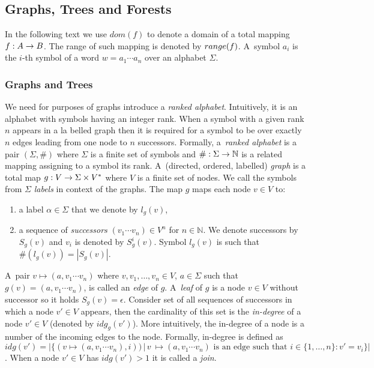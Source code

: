 \documentclass[a4paper, 12pt]{article}
\begin{document}
\subsection{Graphs, Trees and Forests}
\label{sec:graph}

In the following text we use $dom(f)$ to denote a domain of a total mapping $f: A \rightarrow B$.
The range of such mapping is denoted by $range(f)$.
A~symbol $a_i$ is the $i$-th symbol of a word $w = a_1 \cdots a_n$ over an alphabet $\Sigma$.

\subsubsection{Graphs and Trees}
\label{subsec:graph}
We need for purposes of graphs introduce a \emph{ranked alphabet}.
Intuitively, it is an alphabet with symbols having an integer rank.
When a symbol with a given rank $n$ appears in a la belled graph
then it is required for a symbol to be over exactly $n$ edges
leading from one node to $n$ successors.
Formally, a~\emph{ranked alphabet} is a pair $(\Sigma, \#)$ where $\Sigma$ is
a finite set of symbols and $\#: \Sigma \rightarrow \mathbb{N}$ is a related mapping
assigning to a symbol its rank.
A~(directed, ordered, labelled) \emph{graph} is a total map $g: V \rightarrow \Sigma \times V^{*}$ where $V$ is a finite set of nodes.
We call the symbols from $\Sigma$ \emph{labels} in context of the graphs.
The map $g$ maps each node $v\in V$ to:
\begin{enumerate}
	\item a label $\alpha \in \Sigma$ that we denote by $l_g(v)$,
	\item a sequence of \emph{successors} $(v_1 \cdots v_n) \in V^n$ for $n \in \mathbb{N}$.
		We denote successors by $S_g(v)$ and $v_i$ is denoted by $S^i_g(v)$.
	    Symbol $l_g(v)$ is such that $\#(l_g(v)) = |S_g(v)|$.
\end{enumerate}

A~pair $v \mapsto (a, v_1 \cdots v_n)$ where $v, v_1, \ldots, v_n \in V$,
$a \in \Sigma$ such that $g(v) = (a, v_1 \cdots v_n)$, is called an \emph{edge} of $g$.
A~\emph{leaf} of $g$ is a node $v \in V$ without successor so it holds $S_g(v) = \epsilon$.
Consider set of all sequences of successors in which a node $v' \in V$ appears, then
the cardinality of this set is the \emph{in-degree} of a node $v' \in V$ (denoted by $idg_g(v')$).
More intuitively, the in-degree of a node is a number of the incoming edges to the node.
Formally, in-degree is defined as
$idg(v') = |\{(v \mapsto (a, v_1 \cdots v_n),i)) \,|\, v~\mapsto (a, v_1 \cdots v_n)
\text{ is an edge such that } i \in \{1,\ldots,n\}: v' = v_i\}|$.
When a node $v' \in V$ has $idg(v') > 1$ it is called a \emph{join}.
\end{document}
